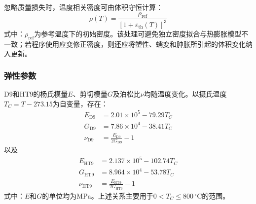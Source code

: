 忽略质量损失时，温度相关密度可由体积守恒计算：
\begin{equation}
	\rho(T)
	=\frac{\rho_{\mathrm{ref}}}
	{\left[1+\varepsilon_{\mathrm{th}}(T)\right]^3}
	\label{eq:clad_density_from_thermal_strain}
\end{equation}
式中：$\rho_{\mathrm{ref}}$为参考温度下的初始密度。该处理可避免独立密度拟合与热膨胀模型不一致；若程序使用应变修正密度，则还应将塑性、蠕变和肿胀所引起的体积变化纳入更新。

\label{sec:cladding_elastoplastic_response}

\subsubsection{弹性参数}

D9和HT9的杨氏模量$E$、剪切模量$G$及泊松比$\nu$均随温度变化\cite{hofmanMetallicFuelsHandbook2019}。以摄氏温度$T_C=T-273.15$为自变量，存在：
\begin{subequations}\label{eq:d9_elastic_properties}
	\begin{align}
		E_{\mathrm{D9}}&=2.01\times10^5-79.29T_C
		\label{eq:d9_youngs_modulus}\\
		G_{\mathrm{D9}}&=7.86\times10^4-38.41T_C
		\label{eq:d9_shear_modulus}\\
		\nu_{\mathrm{D9}}&=\frac{E_{\mathrm{D9}}}{2G_{\mathrm{D9}}}-1
		\label{eq:d9_poisson_ratio}
	\end{align}
\end{subequations}
以及
\begin{subequations}\label{eq:ht9_elastic_properties}
	\begin{align}
		E_{\mathrm{HT9}}&=2.137\times10^5-102.74T_C
		\label{eq:ht9_youngs_modulus}\\
		G_{\mathrm{HT9}}&=8.964\times10^4-53.78T_C
		\label{eq:ht9_shear_modulus}\\
		\nu_{\mathrm{HT9}}&=\frac{E_{\mathrm{HT9}}}{2G_{\mathrm{HT9}}}-1
		\label{eq:ht9_poisson_ratio}
	\end{align}
\end{subequations}
式中：$E$和$G$的单位均为$\mathrm{MPa}$。上述关系主要用于$0<T_C\leq800\,{}^\circ\mathrm{C}$的范围。

